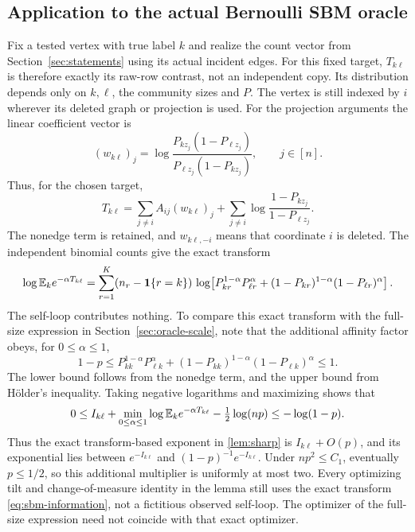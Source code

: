 \subsection{Application to the actual Bernoulli SBM oracle}

Fix a tested vertex with true label $k$ and realize the count vector
from Section~\ref{sec:statements} using its actual incident edges.
For this fixed target, $T_{k\ell}$ is therefore exactly its raw-row
contrast, not an independent copy. Its distribution depends only on
$k,\ell$, the community sizes and $P$. The vertex is still indexed by
$i$ wherever its deleted graph or projection is used.
For the projection arguments the linear coefficient vector is
\begin{equation}\label{eq:sbm-weights}
 (w_{k\ell})_j
   =\log\frac{P_{kz_j}(1-P_{\ell z_j})}
                    {P_{\ell z_j}(1-P_{kz_j})},\qquad j\in[n].
\end{equation}
Thus, for the chosen target,
\[
 T_{k\ell}=\sum_{j\ne i}A_{ij}(w_{k\ell})_j
       +\sum_{j\ne i}\log\frac{1-P_{kz_j}}{1-P_{\ell z_j}}.
\]
The nonedge term is retained, and $w_{k\ell,-i}$ means that coordinate
$i$ is deleted. The independent binomial counts give the exact transform
\begin{equation}\label{eq:sbm-information}
 \log\mathbb E_k e^{-\alpha T_{k\ell}}
 =\sum_{r=1}^K(n_{r}-\mathbf1\{r=k\})\,
 \log\!\left[P_{kr}^{1-\alpha}P_{\ell r}^\alpha
 +(1-P_{kr})^{1-\alpha}(1-P_{\ell r})^\alpha\right].
\end{equation}
The self-loop contributes nothing. To compare this exact transform
with the full-size expression in Section~\ref{sec:oracle-scale}, note
that the additional affinity factor obeys, for $0\le\alpha\le1$,
\[
 1-p\le P_{kk}^{1-\alpha}P_{\ell k}^{\alpha}
 +(1-P_{kk})^{1-\alpha}(1-P_{\ell k})^{\alpha}\le1.
\]
The lower bound follows from the nonedge term, and the upper bound
from H\"older's inequality. Taking negative logarithms and maximizing
shows that
\[
 0\le I_{k\ell}
       +\min_{0\le\alpha\le1}\log\mathbb E_k e^{-\alpha T_{k\ell}}
       -\tfrac12\log(np)\le-\log(1-p).
\]
Thus the exact transform-based exponent in \cref{lem:sharp} is
$I_{k\ell}+O(p)$, and its exponential lies between $e^{-I_{k\ell}}$
and $(1-p)^{-1}e^{-I_{k\ell}}$. Under $np^2\le C_1$, eventually
$p\le1/2$, so this additional multiplier is uniformly at most two.
Every optimizing tilt and change-of-measure identity in the lemma
still uses the exact transform \eqref{eq:sbm-information}, not a
fictitious observed self-loop. The optimizer of the full-size
expression need not coincide with that exact optimizer.
